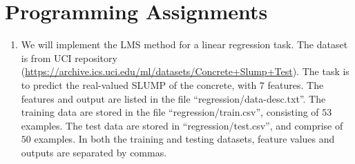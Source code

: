 \documentclass[12pt, fullpage,letterpaper]{article}
\begin{document}
\section{Programming Assignments}

\begin{enumerate}
\item We will implement the LMS method for a linear regression task. The dataset is from UCI repository (\url{https://archive.ics.uci.edu/ml/datasets/Concrete+Slump+Test}). The task is to predict the real-valued SLUMP of the concrete, with $7$ features. The features and output are listed in the file ``regression/data-desc.txt''. The training data are stored in the file ``regression/train.csv'', consisting of $53$ examples. The test data are stored in ``regression/test.csv'', and comprise of $50$ examples. In both the training and testing datasets, feature values and outputs are separated by commas.


\end{enumerate}
\end{document}
